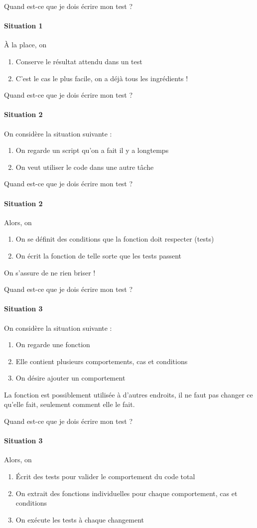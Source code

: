 \documentclass[11pt]{beamer}
\begin{document}
\begin{frame}{Quand est-ce que je dois écrire mon test ?}
\framesubtitle{Situation 1}
À la place, on
\begin{enumerate}
\item Conserve le résultat attendu dans un test
\item C'est le cas le plus facile, on a déjà tous les ingrédients !
\end{enumerate}
\end{frame}

\begin{frame}{Quand est-ce que je dois écrire mon test ?}
\framesubtitle{Situation 2}
On considère la situation suivante : 
\begin{enumerate}
\item On regarde un script qu'on a fait il y a longtemps
\item On veut utiliser le code dans une autre tâche
\end{enumerate}
\end{frame}

\begin{frame}{Quand est-ce que je dois écrire mon test ?}
\framesubtitle{Situation 2}
Alors, on 
\begin{enumerate}
\item On se définit des conditions que la fonction doit respecter (tests)
\item On écrit la fonction de telle sorte que les tests passent
\end{enumerate}
On s'assure de ne rien briser !
\end{frame}

\begin{frame}{Quand est-ce que je dois écrire mon test ?}
\framesubtitle{Situation 3}
On considère la situation suivante : 
\begin{enumerate}
\item On regarde une fonction
\item Elle contient plusieurs comportements, cas et conditions
\item On désire ajouter un comportement
\end{enumerate}
La fonction est possiblement utilisée à d'autres endroits, il ne faut pas changer ce qu'elle fait, seulement comment elle le fait. 
\end{frame}

\begin{frame}{Quand est-ce que je dois écrire mon test ?}
\framesubtitle{Situation 3}
Alors, on 
\begin{enumerate}
\item Écrit des tests pour valider le comportement du code total
\item On extrait des fonctions individuelles pour chaque comportement, cas et conditions
\item On exécute les tests à chaque changement
\end{enumerate}
\end{frame}
\end{document}
